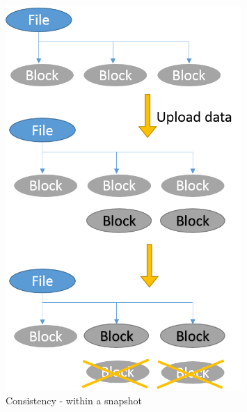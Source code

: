\begin{figure}[hbtp]
\centering
\includegraphics[width=0.8\textwidth]{Chapter-3/figs/fig27.png}
\caption{Consistency - within a snapshot}
\label{fig:consist1}
\end{figure}

